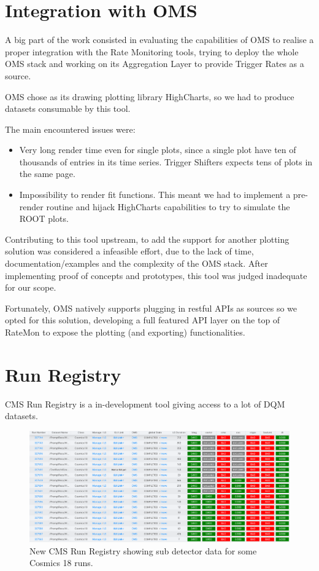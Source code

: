 \section{Integration with OMS}

A big part of the work consisted in evaluating the capabilities of OMS to realise a proper integration with the Rate Monitoring tools, trying to deploy the whole OMS stack and working on its Aggregation Layer to provide Trigger Rates as a source.

OMS chose as its drawing plotting library HighCharts, so we had to produce datasets consumable by this tool.

The main encountered issues were:

\begin{itemize}
    \item Very long render time even for single plots, since a single plot have ten of thousands of entries in its time series. Trigger Shifters expects tens of plots in the same page.
    \item Impossibility to render fit functions. This meant we had to implement a pre-render routine and hijack HighCharts capabilities to try to simulate the ROOT plots.
\end{itemize}

Contributing to this tool upstream, to add the support for another plotting solution was considered a infeasible effort, due to the lack of time, documentation/examples and the complexity of the OMS stack. After implementing proof of concepts and prototypes, this tool was judged inadequate for our scope.

Fortunately, OMS natively supports plugging in restful APIs as sources so we opted for this solution, developing a full featured API layer on the top of RateMon to expose the plotting (and exporting) functionalities.


\section{Run Registry}

CMS Run Registry \cite{cms_collaboration_2019_3599323} is a in-development tool giving access to a lot of DQM datasets.

\begin{figure}
    \centerline{
        \includegraphics[width=0.9\paperwidth]{figures/rr0.png}}
    \caption{New CMS Run Registry showing sub detector data for some Cosmics 18 runs.}
    \label{fig:rr0}
\end{figure}

